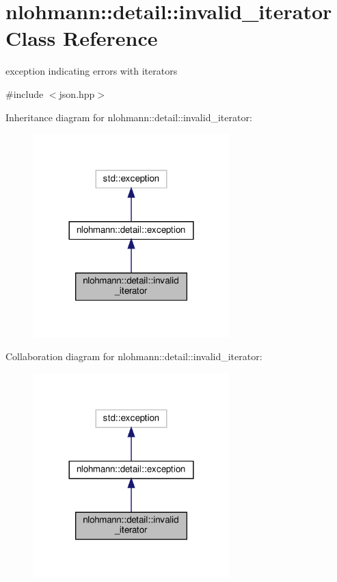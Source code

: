 \hypertarget{classnlohmann_1_1detail_1_1invalid__iterator}{}\section{nlohmann\+:\+:detail\+:\+:invalid\+\_\+iterator Class Reference}
\label{classnlohmann_1_1detail_1_1invalid__iterator}


exception indicating errors with iterators  




{\ttfamily \#include $<$json.\+hpp$>$}



Inheritance diagram for nlohmann\+:\+:detail\+:\+:invalid\+\_\+iterator\+:\nopagebreak
\begin{figure}[H]
\begin{center}
\leavevmode
\includegraphics[width=216pt]{classnlohmann_1_1detail_1_1invalid__iterator__inherit__graph}
\end{center}
\end{figure}


Collaboration diagram for nlohmann\+:\+:detail\+:\+:invalid\+\_\+iterator\+:\nopagebreak
\begin{figure}[H]
\begin{center}
\leavevmode
\includegraphics[width=216pt]{classnlohmann_1_1detail_1_1invalid__iterator__coll__graph}
\end{center}
\end{figure}
